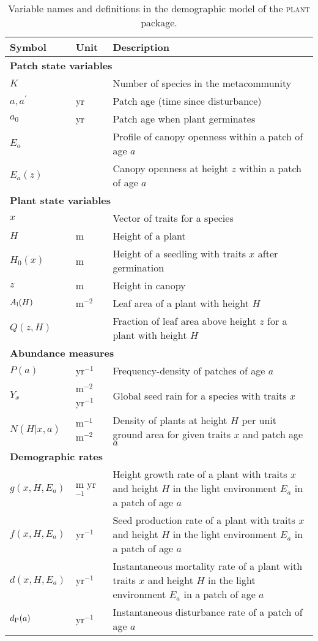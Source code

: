 \documentclass[10pt,twoside]{article}
\newcommand{\plant}{\textsc{plant}}
\begin{document}
\begin{table}[ht]
\caption{Variable names and definitions in the demographic model of the {\plant} package.}
\centering
\begin{tabular}{p{2cm}p{2cm}p{9cm}}
\hline
Symbol & Unit & Description \\
\hline
\multicolumn{3}{l}{\textbf{Patch state variables}} \\
$K$ & & Number of species in the metacommunity\\
$a, a^{\prime}$ & yr & Patch age (time since disturbance)\\
$a_0$ & yr & Patch age when plant germinates \\
$E_a$ & & Profile of canopy openness within a patch of age $a$\\
$E_a(z)$& & Canopy openness at height $z$ within a patch of age $a$\\

\multicolumn{3}{l}{\textbf{Plant state variables}} \\
$x$ & & Vector of traits for a species\\
$H$ & m & Height of a plant\\
$H_0(x)$ & m & Height of a seedling with traits $x$ after germination\\
$z$ & m & Height in canopy\\
$A_{\rm l}(H)$ & m$^{-2}$ & Leaf area of a plant with height $H$ \\
$Q(z, H)$ & & Fraction of leaf area above height $z$ for a plant with height $H$\\

\multicolumn{3}{l}{\textbf{Abundance measures}} \\
$P(a)$ & yr$^{-1}$ & Frequency-density of patches of age $a$ \\
$Y_{x}$ & m$^{-2}$ yr$^{-1}$ & Global seed rain for a species with traits $x$\\
$N(H | x, a)$ & m$^{-1}$ m$^{-2}$ & Density of plants at height $H$ per unit ground area for given traits $x$ and patch age $a$\\

\multicolumn{3}{l}{\textbf{Demographic rates}} \\
$g(x, H, E_a)$ & m yr$^{-1}$ & Height growth rate of a plant with traits $x$ and height $H$ in the light environment $E_a$ in a patch of age $a$\\
$f(x, H, E_a)$ & yr$^{-1}$ & Seed production rate of a plant with traits $x$ and height $H$ in the light environment $E_a$ in a patch of age $a$\\
$d(x, H, E_a)$ & yr$^{-1}$ & Instantaneous mortality rate of a plant with traits $x$ and height $H$ in the light environment $E_a$ in a patch of age $a$\\
$d_{\rm P}(a)$ & yr$^{-1}$ & Instantaneous disturbance rate of a patch of age $a$\\


\end{tabular}
\end{table}
\end{document}
